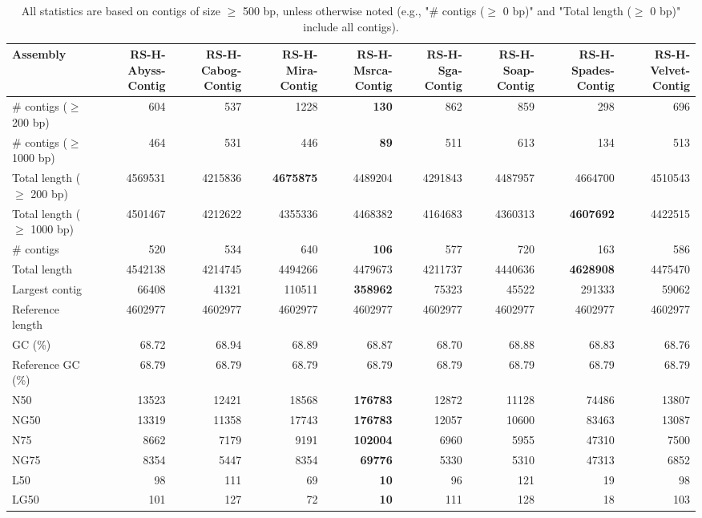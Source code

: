 \documentclass[12pt,a4paper]{article}
\begin{document}
\begin{table}[ht]
\begin{center}
\caption{All statistics are based on contigs of size $\geq$ 500 bp, unless otherwise noted (e.g., "\# contigs ($\geq$ 0 bp)" and "Total length ($\geq$ 0 bp)" include all contigs).}
\begin{tabular}{|l*{8}{|r}|}
\hline
Assembly & RS-H-Abyss-Contig & RS-H-Cabog-Contig & RS-H-Mira-Contig & RS-H-Msrca-Contig & RS-H-Sga-Contig & RS-H-Soap-Contig & RS-H-Spades-Contig & RS-H-Velvet-Contig \\ \hline
\# contigs ($\geq$ 200 bp) & 604 & 537 & 1228 & {\bf 130} & 862 & 859 & 298 & 696 \\ \hline
\# contigs ($\geq$ 1000 bp) & 464 & 531 & 446 & {\bf 89} & 511 & 613 & 134 & 513 \\ \hline
Total length ($\geq$ 200 bp) & 4569531 & 4215836 & {\bf 4675875} & 4489204 & 4291843 & 4487957 & 4664700 & 4510543 \\ \hline
Total length ($\geq$ 1000 bp) & 4501467 & 4212622 & 4355336 & 4468382 & 4164683 & 4360313 & {\bf 4607692} & 4422515 \\ \hline
\# contigs & 520 & 534 & 640 & {\bf 106} & 577 & 720 & 163 & 586 \\ \hline
Total length & 4542138 & 4214745 & 4494266 & 4479673 & 4211737 & 4440636 & {\bf 4628908} & 4475470 \\ \hline
Largest contig & 66408 & 41321 & 110511 & {\bf 358962} & 75323 & 45522 & 291333 & 59062 \\ \hline
Reference length & 4602977 & 4602977 & 4602977 & 4602977 & 4602977 & 4602977 & 4602977 & 4602977 \\ \hline
GC (\%) & 68.72 & 68.94 & 68.89 & 68.87 & 68.70 & 68.88 & 68.83 & 68.76 \\ \hline
Reference GC (\%) & 68.79 & 68.79 & 68.79 & 68.79 & 68.79 & 68.79 & 68.79 & 68.79 \\ \hline
N50 & 13523 & 12421 & 18568 & {\bf 176783} & 12872 & 11128 & 74486 & 13807 \\ \hline
NG50 & 13319 & 11358 & 17743 & {\bf 176783} & 12057 & 10600 & 83463 & 13087 \\ \hline
N75 & 8662 & 7179 & 9191 & {\bf 102004} & 6960 & 5955 & 47310 & 7500 \\ \hline
NG75 & 8354 & 5447 & 8354 & {\bf 69776} & 5330 & 5310 & 47313 & 6852 \\ \hline
L50 & 98 & 111 & 69 & {\bf 10} & 96 & 121 & 19 & 98 \\ \hline
LG50 & 101 & 127 & 72 & {\bf 10} & 111 & 128 & 18 & 103 \\ \hline

\end{tabular}
\end{center}
\end{table}
\end{document}
